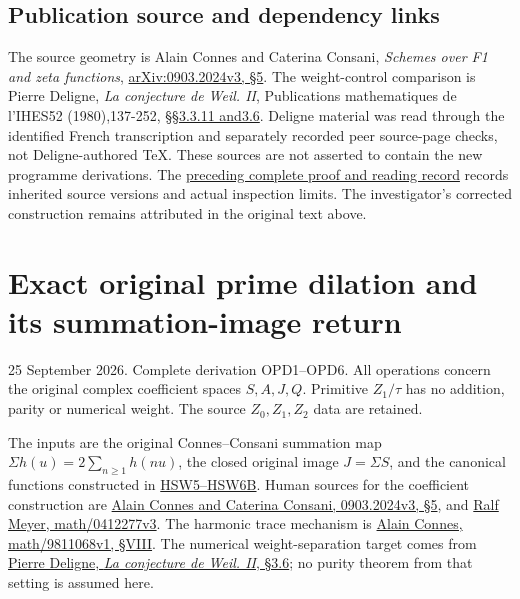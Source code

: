\section{Publication source and dependency
links}\label{publication-source-and-dependency-links-16}

The source geometry is Alain Connes and Caterina Consani, \emph{Schemes
over F1 and zeta functions},
\href{https://arxiv.org/abs/0903.2024v3}{arXiv:0903.2024v3, §5}. The
weight-control comparison is Pierre Deligne, \emph{La conjecture de
Weil. II}, Publications mathematiques de l'IHES52 (1980),137-252,
\href{https://www.numdam.org/item/PMIHES_1980__52__137_0/}{§§3.3.11
and3.6}. Deligne material was read through the identified French
transcription and separately recorded peer source-page checks, not
Deligne-authored TeX. These sources are not asserted to contain the new
programme derivations. The
\href{https://github.com/KokunoYumeto/zeta-function-research-reader/blob/36a82ecca98addb8a98b48204e349737856c7223/workbenches/splitzero-tandem/continuations/20260924-cohomology-weight-and-character-lifts/BUILD_AND_REVIEW.md}{preceding
complete proof and reading record} records inherited source versions and
actual inspection limits. The investigator's corrected construction
remains attributed in the original text above.

\chapter{Exact original prime dilation and its summation-image
return}\label{exact-original-prime-dilation-and-its-summation-image-return}

25 September 2026. Complete derivation OPD1--OPD6. All operations
concern the original complex coefficient spaces \(S,A,J,Q\). Primitive
\(Z_1/\tau\) has no addition, parity or numerical weight. The source
\(Z_0,Z_1,Z_2\) data are retained.

The inputs are the original Connes--Consani summation map
\(\Sigma h(u)=2\sum_{n\ge1}h(nu)\), the closed original image
\(J=\Sigma S\), and the canonical functions constructed in
\href{https://github.com/KokunoYumeto/zeta-function-research-reader/blob/main/workbenches/splitzero-tandem/continuations/20260925-full-source-tensor-and-original-divisor/counterfactual/ORIGINAL_ZETA_HARMONIC_SWEEP_AND_OFFCRITICAL_DEFECT.md}{HSW5--HSW6B}.
Human sources for the coefficient construction are
\href{https://arxiv.org/abs/0903.2024v3}{Alain Connes and Caterina
Consani, 0903.2024v3, §5}, and
\href{https://arxiv.org/abs/math/0412277v3}{Ralf Meyer, math/0412277v3}.
The harmonic trace mechanism is
\href{https://arxiv.org/abs/math/9811068v1}{Alain Connes,
math/9811068v1, §VIII}. The numerical weight-separation target comes
from \href{https://www.numdam.org/item/PMIHES_1980__52__137_0/}{Pierre
Deligne, \emph{La conjecture de Weil. II}, §3.6}; no purity theorem from
that setting is assumed here.

